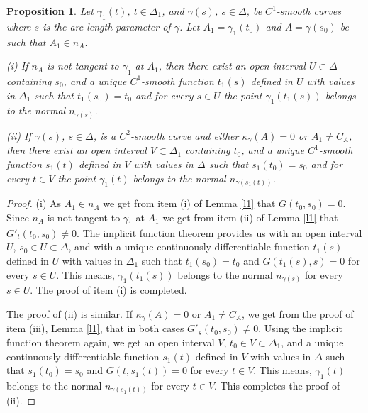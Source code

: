 \documentclass[10pt,a4paper]{amsart}
\newtheorem{prop}[thm]{Proposition}
\def\g{\gamma}
\begin{document}
\begin{prop} \label{nnorm1}
 Let $\g_1(t)$, $t \in \Delta_1$, and $\g(s)$,
 $s \in \Delta$, be  $C^1$-smooth curves where  $s$ is the arc-length parameter of
 $\g$. Let $A_1= \g_1(t_0)$ and $A= \g(s_0)$ be such that $A_1 \in n_A$.

(i) If $n_A$ is not tangent to $\g_1$ at $A_1$,
then there exist an open interval $U \subset \Delta$ containing $s_0$, and a unique $C^1$-smooth function $t_1(s)$ defined in $ U$ with values in
$\Delta_1$ such that $t_1(s_0) = t_0$ and for every
$s \in U$ the point $\g_1(t_1(s))$ belongs to the normal $n_{\g(s)}$.

(ii) If $\g(s)$, $s \in \Delta$, is a $C^2$-smooth curve and either $\kappa_{\g}(A)=0$ or $A_1\neq C_A$, then there exist an open interval $V \subset \Delta_1$ containing $t_0$, and a unique $C^1$-smooth function $s_1(t)$ defined in $V$ with values in
$\Delta$ such that $s_1(t_0) = s_0$ and for every
$t \in V$ the point $\g_1(t)$ belongs to the normal $n_{\g(s_1(t))}$.
\end{prop}

\begin{proof}
(i) As $A_1 \in n_A$ we get from item (i) of Lemma \ref{l1} that
$G(t_0,s_0)=0$. Since $n_A$ is not tangent to $\g_1$ at $A_1$ we get from item (ii) of Lemma \ref{l1} that $G'_t(t_0,s_0) \neq 0$.
The implicit function theorem provides us with an open interval $U$, $s_0 \in U \subset \Delta$, and with a unique continuously differentiable function $t_1(s)$ defined in $U$ with values in
$\Delta_1$ such that $t_1(s_0)=t_0$ and $G(t_1(s), s) =0$ for every $s \in U$. This means,  $\g_1(t_1(s))$ belongs to the normal $n_{\g(s)}$ for every $s \in U$. The proof of item (i) is completed.

The proof of (ii) is similar. If $\kappa_{\g}(A)=0$ or $A_1\neq C_A$, we get from the proof of item (iii), Lemma \ref{l1},  that in both cases $G'_s(t_0,s_0) \neq 0$. Using the implicit function theorem again, we get an open interval $V $, $t_0 \in V \subset \Delta_1$, and a unique continuously differentiable function $s_1(t)$ defined in $V$ with values in $\Delta$ such that $s_1(t_0)=s_0$ and
$G(t,s_1(t)) =0$ for every $t\in V$.
This means, $\g_1(t)$ belongs to the normal $n_{\g(s_1(t))}$ for every $t \in V$. This completes the proof of (ii).

\end{proof}
\end{document}
